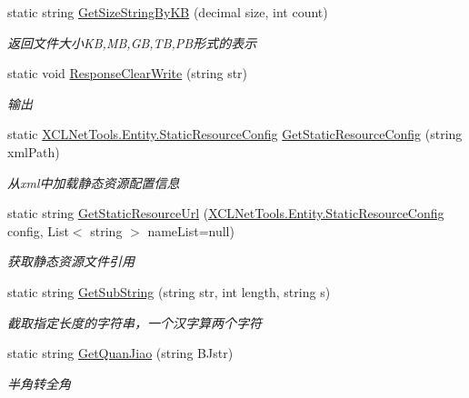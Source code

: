 \begin{DoxyCompactItemize}
static string \hyperlink{class_x_c_l_net_tools_1_1_string_hander_1_1_common_a4e1ade8275f7aaca63be7a5af1d5f507}{Get\+Size\+String\+By\+KB} (decimal size, int count)
\begin{DoxyCompactList}\small\item\em 返回文件大小\+KB,MB,GB,TB,P\+B形式的表示 \end{DoxyCompactList}\item 
static void \hyperlink{class_x_c_l_net_tools_1_1_string_hander_1_1_common_a9a36061254c3ec3898e45ade6193c745}{Response\+Clear\+Write} (string str)
\begin{DoxyCompactList}\small\item\em 输出 \end{DoxyCompactList}\item 
static \hyperlink{class_x_c_l_net_tools_1_1_entity_1_1_static_resource_config}{X\+C\+L\+Net\+Tools.\+Entity.\+Static\+Resource\+Config} \hyperlink{class_x_c_l_net_tools_1_1_string_hander_1_1_common_a67eca9ff4f18688db0b27ad91cb87ed9}{Get\+Static\+Resource\+Config} (string xml\+Path)
\begin{DoxyCompactList}\small\item\em 从xml中加载静态资源配置信息 \end{DoxyCompactList}\item 
static string \hyperlink{class_x_c_l_net_tools_1_1_string_hander_1_1_common_aab3a93f5a39ca48480843f83910fdc8f}{Get\+Static\+Resource\+Url} (\hyperlink{class_x_c_l_net_tools_1_1_entity_1_1_static_resource_config}{X\+C\+L\+Net\+Tools.\+Entity.\+Static\+Resource\+Config} config, List$<$ string $>$ name\+List=null)
\begin{DoxyCompactList}\small\item\em 获取静态资源文件引用 \end{DoxyCompactList}\item 
static string \hyperlink{class_x_c_l_net_tools_1_1_string_hander_1_1_common_a7e09ea6b3ad85e825e7623017e3e3f6b}{Get\+Sub\+String} (string str, int length, string s)
\begin{DoxyCompactList}\small\item\em 截取指定长度的字符串，一个汉字算两个字符 \end{DoxyCompactList}\item 
static string \hyperlink{class_x_c_l_net_tools_1_1_string_hander_1_1_common_ac4c5c91417fc48267b8c2600bb857dca}{Get\+Quan\+Jiao} (string B\+Jstr)
\begin{DoxyCompactList}\small\item\em 半角转全角 \end{DoxyCompactList}\item 

\end{DoxyCompactItemize}
